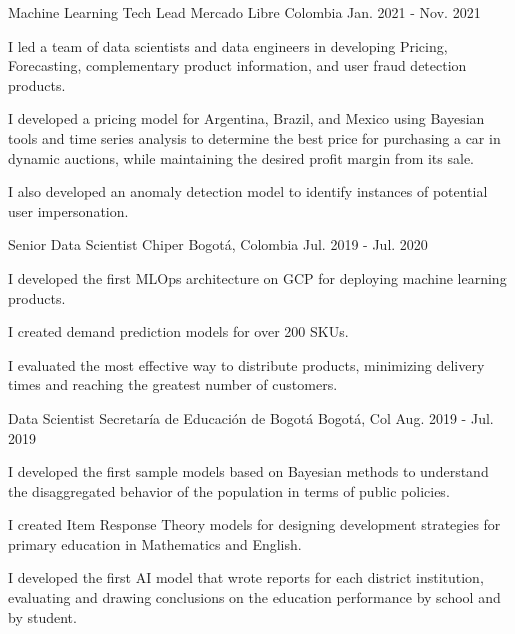 \begin{cventries}
  \cventry
    {Machine Learning Tech Lead} %
    {Mercado Libre} %
    {Colombia} %
    {Jan. 2021 - Nov. 2021} %
    {
      \begin{cvitems} %
        \item {I led a team of data scientists and data engineers in developing Pricing, Forecasting, complementary product information, and user fraud detection products.}
        \item {I developed a pricing model for Argentina, Brazil, and Mexico using Bayesian tools and time series analysis to determine the best price for purchasing a car in dynamic auctions, while maintaining the desired profit margin from its sale.}
        \item {I also developed an anomaly detection model to identify instances of potential user impersonation.}
      \end{cvitems}
    }

  \cventry
    {Senior Data Scientist} %
    {Chiper} %
    {Bogotá, Colombia} %
    {Jul. 2019 - Jul. 2020} %
    {
      \begin{cvitems} %
        \item {I developed the first MLOps architecture on GCP for deploying machine learning products.}
        \item {I created demand prediction models for over 200 SKUs.}
        \item {I evaluated the most effective way to distribute products, minimizing delivery times and reaching the greatest number of customers.}
      \end{cvitems}
    }

  \cventry
    {Data Scientist} %
    {Secretaría de Educación de Bogotá} %
    {Bogotá, Col} %
    {Aug. 2019 - Jul. 2019} %
    {
      \begin{cvitems} %
        \item {I developed the first sample models based on Bayesian methods to understand the disaggregated behavior of the population in terms of public policies.}
        \item {I created Item Response Theory models for designing development strategies for primary education in Mathematics and English.}
        \item {I developed the first AI model that wrote reports for each district institution, evaluating and drawing conclusions on the education performance by school and by student.}
      \end{cvitems}
    }


\end{cventries}
